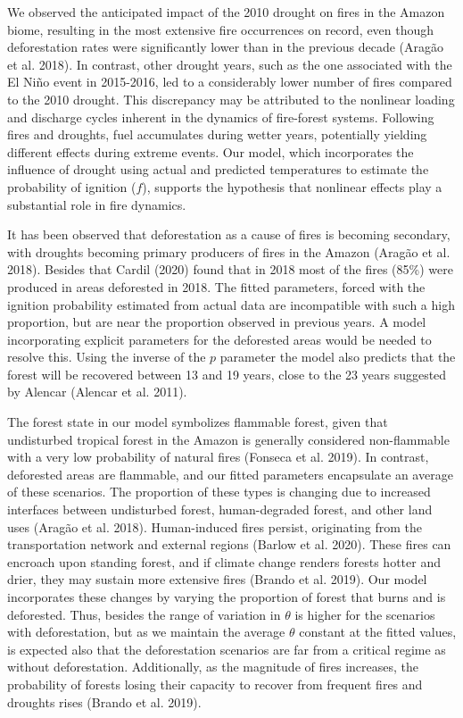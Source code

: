\documentclass[
]{article}
\begin{document}
We observed the anticipated impact of the 2010 drought on fires in the
Amazon biome, resulting in the most extensive fire occurrences on
record, even though deforestation rates were significantly lower than in
the previous decade (Aragão et al. 2018). In contrast, other drought
years, such as the one associated with the El Niño event in 2015-2016,
led to a considerably lower number of fires compared to the 2010
drought. This discrepancy may be attributed to the nonlinear loading and
discharge cycles inherent in the dynamics of fire-forest systems.
Following fires and droughts, fuel accumulates during wetter years,
potentially yielding different effects during extreme events. Our model,
which incorporates the influence of drought using actual and predicted
temperatures to estimate the probability of ignition (\(f\)), supports
the hypothesis that nonlinear effects play a substantial role in fire
dynamics.

It has been observed that deforestation as a cause of fires is becoming
secondary, with droughts becoming primary producers of fires in the
Amazon (Aragão et al. 2018). Besides that Cardil (2020) found that in
2018 most of the fires (85\%) were produced in areas deforested in 2018.
The fitted parameters, forced with the ignition probability estimated
from actual data are incompatible with such a high proportion, but are
near the proportion observed in previous years. A model incorporating
explicit parameters for the deforested areas would be needed to resolve
this. Using the inverse of the \(p\) parameter the model also predicts
that the forest will be recovered between 13 and 19 years, close to the
23 years suggested by Alencar (Alencar et al. 2011).

The forest state in our model symbolizes flammable forest, given that
undisturbed tropical forest in the Amazon is generally considered
non-flammable with a very low probability of natural fires (Fonseca et
al. 2019). In contrast, deforested areas are flammable, and our fitted
parameters encapsulate an average of these scenarios. The proportion of
these types is changing due to increased interfaces between undisturbed
forest, human-degraded forest, and other land uses (Aragão et al. 2018).
Human-induced fires persist, originating from the transportation network
and external regions (Barlow et al. 2020). These fires can encroach upon
standing forest, and if climate change renders forests hotter and drier,
they may sustain more extensive fires (Brando et al. 2019). Our model
incorporates these changes by varying the proportion of forest that
burns and is deforested. Thus, besides the range of variation in
\(\theta\) is higher for the scenarios with deforestation, but as we
maintain the average \(\theta\) constant at the fitted values, is
expected also that the deforestation scenarios are far from a critical
regime as without deforestation. Additionally, as the magnitude of fires
increases, the probability of forests losing their capacity to recover
from frequent fires and droughts rises (Brando et al. 2019).
\end{document}
